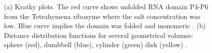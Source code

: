 \begin{figure}
\begin{subfigure}[b]{0.4\textwidth}
                \caption{}
                \label{fig:Distance distribution plot}
        \end{subfigure}
        \caption{(a) Kratky plots. The red curve shows unfolded RNA domain P4-P6 from the Tetrahymena ribozyme where the salt concentration was low. Blue curve implies the domain was folded and monomeric \cite{pollack2011saxs}. (b) Distance distribution functions for several geometrical volumes: sphere (red),  dumbbell (blue), cylinder (green) disk (yellow) \cite{blanchet2013small}.}
        \label{fig:SAXS structural analysis graphs}
    \end{figure}
